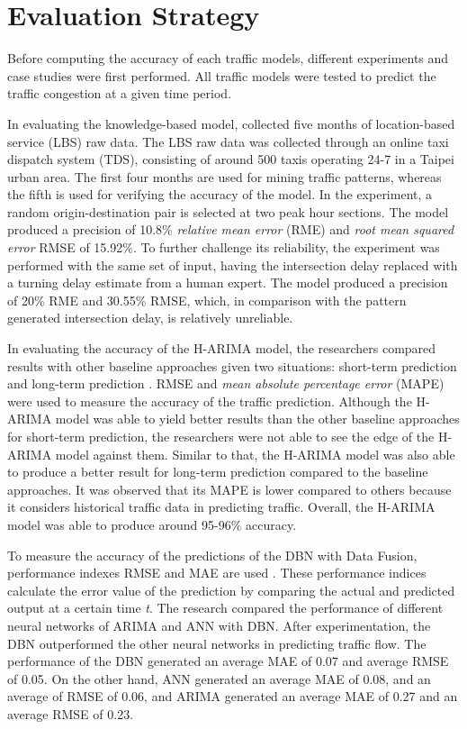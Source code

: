 \section{Evaluation Strategy}
Before computing the accuracy of each traffic models, different experiments and case studies were first performed. All traffic models were tested to predict the traffic congestion at a given time period.

In evaluating the knowledge-based model,  collected five months of location-based service (LBS) raw data. The LBS raw data was collected through an online taxi dispatch system (TDS), consisting of around 500 taxis operating 24-7 in a Taipei urban area. The first four months are used for mining traffic patterns, whereas the fifth is used for verifying the accuracy of the model. In the experiment, a random origin-destination pair is selected at two peak hour sections. The model produced a precision of 10.8\% \textit{relative mean error} (RME) and \textit{root mean squared error} RMSE of 15.92\%. To further challenge its reliability, the experiment was performed with the same set of input, having the intersection delay replaced with a turning delay estimate from a human expert. The model produced a precision of 20\% RME and 30.55\% RMSE, which, in comparison with the pattern generated intersection delay, is relatively unreliable. 

In evaluating the accuracy of the H-ARIMA model, the researchers compared results with other baseline approaches given two situations: short-term prediction and long-term prediction . RMSE and \textit{mean absolute percentage error} (MAPE) were used to measure the accuracy of the traffic prediction. Although the H-ARIMA model was able to yield better results than the other baseline approaches for short-term prediction, the researchers were not able to see the edge of the H-ARIMA model against them. Similar to that, the H-ARIMA model was also able to produce a better result for long-term prediction compared to the baseline approaches. It was observed that its MAPE is lower compared to others because it considers historical traffic data in predicting traffic. Overall, the H-ARIMA model was able to produce around 95-96\% accuracy.

To measure the accuracy of the predictions of the DBN with Data Fusion, performance indexes RMSE and MAE are used . These performance indices calculate the error value of the prediction by comparing the actual and predicted output at a certain time \textit{t}. The research compared the performance of different neural networks of ARIMA and ANN with DBN. After experimentation, the DBN outperformed the other neural networks in predicting traffic flow. The performance of the DBN generated an average MAE of 0.07 and average RMSE of 0.05. On the other hand, ANN generated an average MAE of 0.08, and an average of RMSE of 0.06, and ARIMA generated an average MAE of 0.27 and an average RMSE of 0.23.

